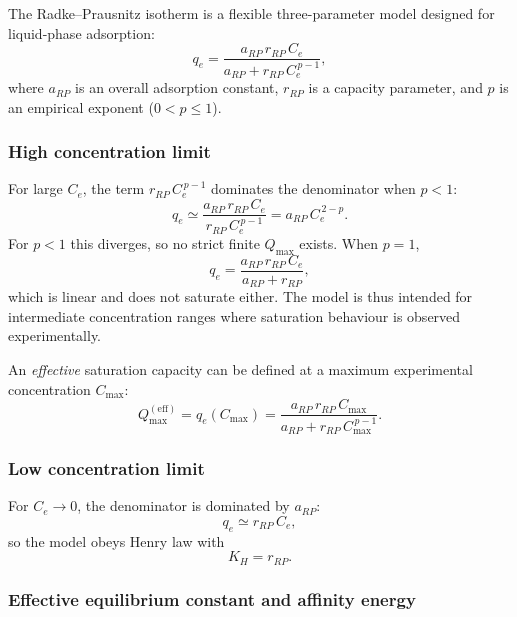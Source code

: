 \documentclass[12pt]{article}
\begin{document}
	The Radke--Prausnitz isotherm is a flexible three-parameter model
	designed for liquid-phase adsorption:
	\begin{equation}
		q_e = \frac{a_{RP}\, r_{RP}\, C_e}{a_{RP} + r_{RP}\, C_e^{\,p-1}},
		\label{eq:RadkePrausnitz}
	\end{equation}
	where $a_{RP}$ is an overall adsorption constant, $r_{RP}$ is a
	capacity parameter, and $p$ is an empirical exponent
	($0 < p \leq 1$).

	\subsubsection{High concentration limit}

	For large $C_e$, the term $r_{RP}\,C_e^{\,p-1}$ dominates the
	denominator when $p < 1$:
	\begin{equation}
		q_e \simeq \frac{a_{RP}\, r_{RP}\, C_e}{r_{RP}\, C_e^{\,p-1}}
		= a_{RP}\, C_e^{\,2-p}.
	\end{equation}
	For $p < 1$ this diverges, so no strict finite $Q_{\max}$ exists.
	When $p = 1$,
	\begin{equation}
		q_e = \frac{a_{RP}\, r_{RP}\, C_e}{a_{RP} + r_{RP}},
	\end{equation}
	which is linear and does not saturate either.  The model is thus
	intended for intermediate concentration ranges where saturation
	behaviour is observed experimentally.

	An \emph{effective} saturation capacity can be defined at a
	maximum experimental concentration $C_{\max}$:
	\begin{equation}
		Q_{\max}^{\mathrm{(eff)}} = q_e(C_{\max})
		= \frac{a_{RP}\, r_{RP}\, C_{\max}}
		{a_{RP} + r_{RP}\, C_{\max}^{\,p-1}}.
	\end{equation}

	\subsubsection{Low concentration limit}

	For $C_e \to 0$, the denominator is dominated by $a_{RP}$:
	\begin{equation}
		q_e \simeq r_{RP}\, C_e,
	\end{equation}
	so the model obeys Henry law with
	\begin{equation}
		\boxed{K_H = r_{RP}.}
	\end{equation}

	\subsubsection{Effective equilibrium constant and affinity energy}
\end{document}
